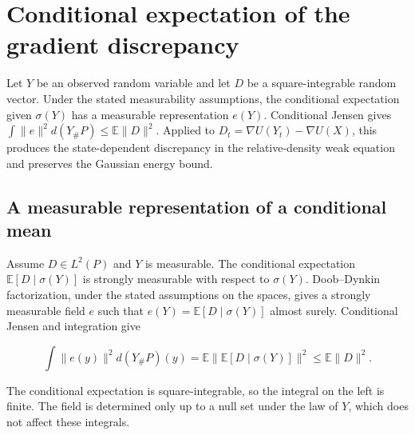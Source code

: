 \documentclass[11pt,a4paper]{report}
\begin{document}
\section{\texorpdfstring{Conditional expectation of the gradient discrepancy}{Conditional expectation of the gradient discrepancy}}
\label{proof-module-UnadjustedLangevin-LSI-ConditionalDrift-lean}


Let \(Y\) be an observed random variable and let \(D\) be a square-integrable random vector. Under the stated measurability assumptions, the conditional expectation given \(\sigma(Y)\) has a measurable representation \(e(Y)\). Conditional Jensen gives \(\int\|e\|^2d(Y_\#P)\le\mathbb E\|D\|^2\). Applied to \(D_t=\nabla U(Y_t)-\nabla U(X)\), this produces the state-dependent discrepancy in the relative-density weak equation and preserves the Gaussian energy bound.

\subsection{\texorpdfstring{A measurable representation of a conditional mean}{A measurable representation of a conditional mean}}
\label{report-step-UnadjustedLangevin-LSI-ConditionalDrift-lean-1}


Assume \(D\in L^2(P)\) and \(Y\) is measurable. The conditional expectation \(\mathbb E[D\mid\sigma(Y)]\) is strongly measurable with respect to \(\sigma(Y)\). Doob–Dynkin factorization, under the stated assumptions on the spaces, gives a strongly measurable field \(e\) such that \(e(Y)=\mathbb E[D\mid\sigma(Y)]\) almost surely. Conditional Jensen and integration give

\[\int\|e(y)\|^2d(Y_\#P)(y)=\mathbb E\|\mathbb E[D\mid\sigma(Y)]\|^2\le\mathbb E\|D\|^2.\]

The conditional expectation is square-integrable, so the integral on the left is finite. The field is determined only up to a null set under the law of \(Y\), which does not affect these integrals.
\end{document}
